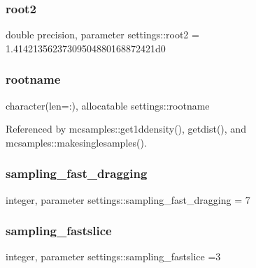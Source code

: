 \subsubsection{\texorpdfstring{root2}{root2}}
{\footnotesize\ttfamily double precision, parameter settings\+::root2 = 1.\+41421356237309504880168872421d0}

\mbox{\label{namespacesettings_a4a3bc0d40d0532bc2f7f2cc87170068a}} 
\subsubsection{\texorpdfstring{rootname}{rootname}}
{\footnotesize\ttfamily character(len=\+:), allocatable settings\+::rootname}



Referenced by mcsamples\+::get1ddensity(), getdist(), and mcsamples\+::makesinglesamples().

\mbox{\label{namespacesettings_a9cd020650f7e83b9fda45b3bfdda34bf}} 
\subsubsection{\texorpdfstring{sampling\+\_\+fast\+\_\+dragging}{sampling\_fast\_dragging}}
{\footnotesize\ttfamily integer, parameter settings\+::sampling\+\_\+fast\+\_\+dragging = 7}

\mbox{\label{namespacesettings_af8673aadd88b8cfe802aeb29376ec2a6}} 
\subsubsection{\texorpdfstring{sampling\+\_\+fastslice}{sampling\_fastslice}}
{\footnotesize\ttfamily integer, parameter settings\+::sampling\+\_\+fastslice =3}

\mbox{\label{namespacesettings_a01e6691ce72977baf15dd20434012f65}} 
